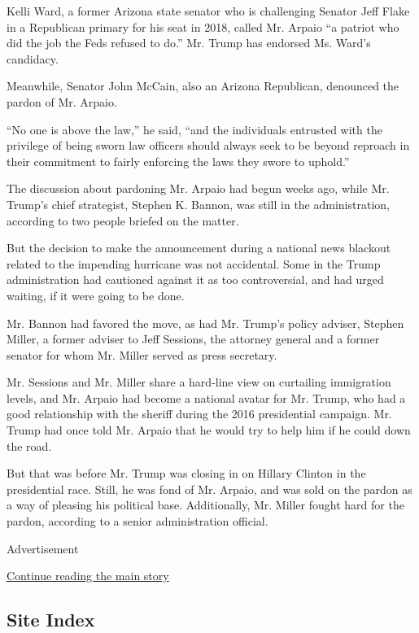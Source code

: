 Kelli Ward, a former Arizona state senator who is challenging Senator
Jeff Flake in a Republican primary for his seat in 2018, called Mr.
Arpaio ``a patriot who did the job the Feds refused to do.'' Mr. Trump
has endorsed Ms. Ward's candidacy.

Meanwhile, Senator John McCain, also an Arizona Republican, denounced
the pardon of Mr. Arpaio.

``No one is above the law,'' he said, ``and the individuals entrusted
with the privilege of being sworn law officers should always seek to be
beyond reproach in their commitment to fairly enforcing the laws they
swore to uphold.''

The discussion about pardoning Mr. Arpaio had begun weeks ago, while Mr.
Trump's chief strategist, Stephen K. Bannon, was still in the
administration, according to two people briefed on the matter.

But the decision to make the announcement during a national news
blackout related to the impending hurricane was not accidental. Some in
the Trump administration had cautioned against it as too controversial,
and had urged waiting, if it were going to be done.

Mr. Bannon had favored the move, as had Mr. Trump's policy adviser,
Stephen Miller, a former adviser to Jeff Sessions, the attorney general
and a former senator for whom Mr. Miller served as press secretary.

Mr. Sessions and Mr. Miller share a hard-line view on curtailing
immigration levels, and Mr. Arpaio had become a national avatar for Mr.
Trump, who had a good relationship with the sheriff during the 2016
presidential campaign. Mr. Trump had once told Mr. Arpaio that he would
try to help him if he could down the road.

But that was before Mr. Trump was closing in on Hillary Clinton in the
presidential race. Still, he was fond of Mr. Arpaio, and was sold on the
pardon as a way of pleasing his political base. Additionally, Mr. Miller
fought hard for the pardon, according to a senior administration
official.

Advertisement

\protect\hyperlink{after-bottom}{Continue reading the main story}

\hypertarget{site-index}{%
\subsection{Site Index}\label{site-index}}

